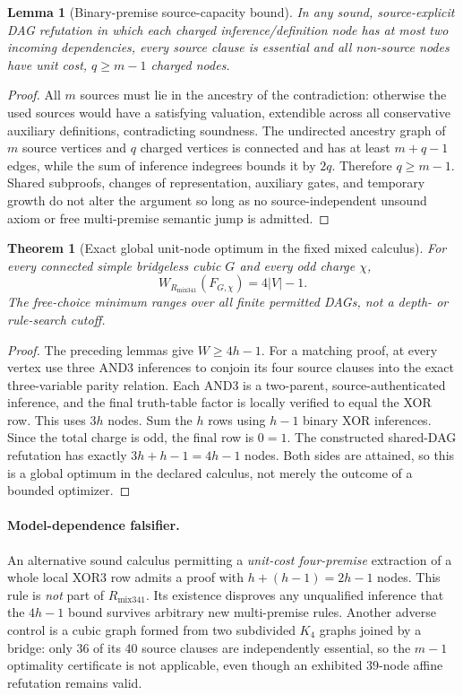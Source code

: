 \documentclass[11pt]{article}
\newtheorem{theorem}{Theorem}
\newtheorem{lemma}{Lemma}
\begin{document}
\begin{lemma}[Binary-premise source-capacity bound]
In any sound, source-explicit DAG refutation in which each charged inference/definition node has at most two incoming dependencies, every source clause is essential and all non-source nodes have unit cost, $q\ge m-1$ charged nodes.
\end{lemma}
\begin{proof}
All $m$ sources must lie in the ancestry of the contradiction: otherwise the used sources would have a satisfying valuation, extendible across all conservative auxiliary definitions, contradicting soundness. The undirected ancestry graph of $m$ source vertices and $q$ charged vertices is connected and has at least $m+q-1$ edges, while the sum of inference indegrees bounds it by $2q$. Therefore $q\ge m-1$. Shared subproofs, changes of representation, auxiliary gates, and temporary growth do not alter the argument so long as no source-independent unsound axiom or free multi-premise semantic jump is admitted.
\end{proof}

\begin{theorem}[Exact global unit-node optimum in the fixed mixed calculus]
For every connected simple bridgeless cubic $G$ and every odd charge $\chi$,
\[
 \boxed{W_{R_{\mathrm{mix341}}}(F_{G,\chi})=4|V|-1.}
\]
The free-choice minimum ranges over \emph{all finite} permitted DAGs, not a depth- or rule-search cutoff.
\end{theorem}
\begin{proof}
The preceding lemmas give $W\ge 4h-1$. For a matching proof, at every vertex use three AND3 inferences to conjoin its four source clauses into the exact three-variable parity relation. Each AND3 is a two-parent, source-authenticated inference, and the final truth-table factor is locally verified to equal the XOR row. This uses $3h$ nodes. Sum the $h$ rows using $h-1$ binary XOR inferences. Since the total charge is odd, the final row is $0=1$. The constructed shared-DAG refutation has exactly $3h+h-1=4h-1$ nodes. Both sides are attained, so this is a global optimum in the declared calculus, not merely the outcome of a bounded optimizer.
\end{proof}

\paragraph{Model-dependence falsifier.} An alternative sound calculus permitting a \emph{unit-cost four-premise} extraction of a whole local XOR3 row admits a proof with $h+(h-1)=2h-1$ nodes. This rule is \emph{not} part of $R_{\mathrm{mix341}}$. Its existence disproves any unqualified inference that the $4h-1$ bound survives arbitrary new multi-premise rules. Another adverse control is a cubic graph formed from two subdivided $K_4$ graphs joined by a bridge: only 36 of its 40 source clauses are independently essential, so the $m-1$ optimality certificate is not applicable, even though an exhibited $39$-node affine refutation remains valid.
\end{document}
